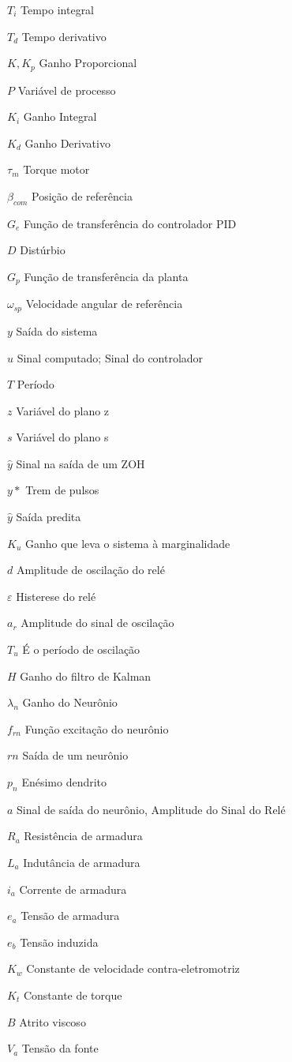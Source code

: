 \begin{simbolos}
  \item[$T_i$] Tempo integral
  \item[$T_d$] Tempo derivativo
  \item[$K, K_p$] Ganho Proporcional
  \item[$P$] Variável de processo
  \item[$K_i$] Ganho Integral
  \item[$K_d$] Ganho Derivativo
  \item[$\tau_m$] Torque motor
  \item[$\beta_{com}$] Posição de referência
  \item[$G_e$] Função de transferência do controlador PID
  \item[$D$] Distúrbio
  \item[$G_p$] Função de transferência da planta
  \item[$\omega_{sp}$] Velocidade angular de referência
  \item[$y$] Saída do sistema
  \item[$u$] Sinal computado; Sinal do controlador
  \item[$T$] Período
  \item[$z$] Variável do plano z
  \item[$s$] Variável do plano s
  \item[$\hat{y}$] Sinal na saída de um ZOH
  \item[$y*$] Trem de pulsos
  \item[$\hat{y}$] Saída predita
  \item[$K_u$] Ganho que leva o sistema à marginalidade
  \item[$d$] Amplitude de oscilação do relé
  \item[$\varepsilon$] Histerese do relé
  \item[$a_r$] Amplitude do sinal de oscilação
  \item[$T_u$] É o período de oscilação
  \item[$H$] Ganho do filtro de Kalman
  \item[$\lambda_n$] Ganho do Neurônio
  \item[$f_{rn}$] Função excitação do neurônio
  \item[$rn$] Saída de um neurônio
  \item[$p_n$] Enésimo dendrito
  \item[$a$] Sinal de saída do neurônio, Amplitude do Sinal do Relé
  \item[$R_a$] Resistência de armadura
  \item[$L_a$] Indutância de armadura
  \item[$i_a$] Corrente de armadura
  \item[$e_a$] Tensão de armadura
  \item[$e_b$] Tensão induzida
  \item[$K_w$] Constante de velocidade contra-eletromotriz 
  \item[$K_t$] Constante de torque
  \item[$B$] Atrito viscoso
  \item[$V_a$] Tensão da fonte
\end{simbolos}